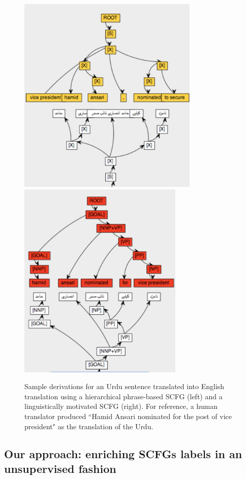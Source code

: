 \begin{figure}
\includegraphics[height=3.75in]{SCFGs/hiero-tree}
\includegraphics[height=3.75in]{SCFGs/samt-tree}
\caption{Sample derivations for an Urdu sentence translated into English translation using a hierarchical phrase-based SCFG (left) and a linguistically motivated SCFG (right).  For reference, a human translator produced ``Hamid Ansari nominated for the post of vice president" as the translation of the Urdu. }
\label{example-derivations}
\end{figure}


\subsection{Our approach: enriching SCFGs labels in an unsupervised fashion}\label{samt}

